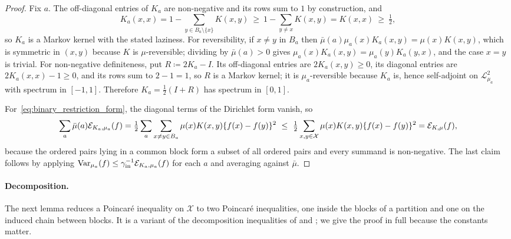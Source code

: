 \documentclass[aos]{imsart}%
\newcommand{\ambientspace}[0]{\mathcal{X}}
\newcommand{\calL}[0]{\mathcal{L}}
\newcommand{\Var}{\mathrm{Var}}
\theoremstyle{plain}
\theoremstyle{definition}
\begin{document}
    \begin{proof}
        Fix $a$. The off-diagonal entries of $K_a$ are non-negative and its
        rows sum to $1$ by construction, and
        \begin{equation*}
            K_a(x,x)=1-\sum_{y\in B_a\setminus\{x\}}K(x,y)
            \ \geq\ 1-\sum_{y\neq x}K(x,y)=K(x,x)\ \geq\ \tfrac12,
        \end{equation*}
        so $K_a$ is a Markov kernel with the stated laziness. For
        reversibility, if $x\neq y$ in $B_a$ then
        $\bar\mu(a)\mu_a(x)K_a(x,y)=\mu(x)K(x,y)$, which is symmetric in
        $(x,y)$ because $K$ is $\mu$-reversible; dividing by $\bar\mu(a)>0$
        gives $\mu_a(x)K_a(x,y)=\mu_a(y)K_a(y,x)$, and the case $x=y$ is
        trivial. For non-negative definiteness, put $R\coloneq2K_a-I$. Its
        off-diagonal entries are $2K_a(x,y)\geq0$, its diagonal entries are
        $2K_a(x,x)-1\geq0$, and its rows sum to $2-1=1$, so $R$ is a Markov
        kernel; it is $\mu_a$-reversible because $K_a$ is, hence self-adjoint
        on $\calL^{2}_{\mu_a}$ with spectrum in $[-1,1]$. Therefore
        $K_a=\tfrac12(I+R)$ has spectrum in $[0,1]$.

        For~\eqref{eq:binary_restriction_form}, the diagonal terms of the
        Dirichlet form vanish, so
        \begin{equation*}
            \sum_{a}\bar\mu(a)\Dir_{K_a,\mu_a}(f)
            =\tfrac12\sum_{a}\sum_{x\neq y\in B_a}\mu(x)K(x,y)
            \{f(x)-f(y)\}^{2}
            \ \leq\ \tfrac12\sum_{x,y\in\ambientspace}\mu(x)K(x,y)
            \{f(x)-f(y)\}^{2}
            =\Dir_{K,\mu}(f),
        \end{equation*}
        because the ordered pairs lying in a common block form a subset of all
        ordered pairs and every summand is non-negative. The last claim follows
        by applying $\Var_{\mu_a}(f)\leq\gamma_{\mathrm{in}}^{-1}
        \Dir_{K_a,\mu_a}(f)$ for each $a$ and averaging against $\bar\mu$.
    \end{proof}

    \paragraph{Decomposition.} The next lemma reduces a Poincar\'e inequality
    on $\ambientspace$ to two Poincar\'e inequalities, one inside the blocks of
    a partition and one on the induced chain between blocks. It is a variant of
    the decomposition inequalities of \citet{MadrasRandall2002} and
    \citet{JerrumSonTetaliVigoda2004}; we give the proof in full because the constants matter.
\end{document}
